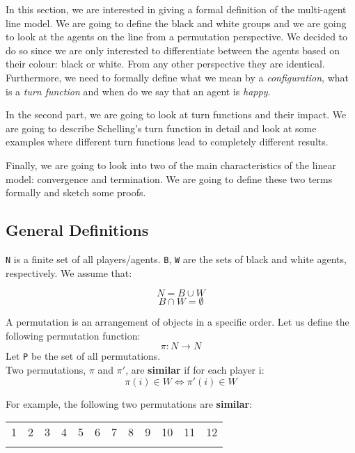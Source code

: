 \documentclass[../main.tex]{subfiles}
\begin{document}
In this section, we are interested in giving a formal definition of the multi-agent line model. We are going to define the black and white groups and we are going to look at the agents on the line from a permutation perspective. We decided to do so since we are only interested to differentiate between the agents based on their colour: black or white. From any other perspective they are identical. Furthermore, we need to formally define what we mean by a \textit{configuration}, what is a \textit{turn function} and when do we say that an agent is \textit{happy}. 

In the second part, we are going to look at turn functions and their impact. We are going to describe Schelling's turn function in detail and look at some examples where different turn functions lead to completely different results.

Finally, we are going to look into two of the main characteristics of the linear model: convergence and termination. We are going to define these two terms formally and sketch some proofs.

\subsection{General Definitions}
\verb|N| is a finite set of all players/agents. \verb|B|, \verb|W| are the sets of black and white agents, respectively. We assume that:

\[ N = B \cup W\]
\[B \cap W = \emptyset\]

A permutation is an arrangement of objects in a specific order. Let us define the following permutation function:
\[ \pi : N \rightarrow N\]
Let \verb|P| be the set of all permutations.\\

Two permutations, $\pi$ and $\pi'$, are \textbf{similar} if for each player i:
\[\pi(i) \in W \Leftrightarrow \pi'(i) \in W\]

For example, the following two permutations are \textbf{similar}:
\begin{table}[H]
\begin{center}
{\begin{tabular}{| c |c| c| c| c |c| c |c| c |c |c |c |}
\hline
1 & 2 &3 &4 &5 &6  &7 &8 &9 &10 &11 & 12 \\
\x & \x &\z &\z &\z &\z  &\z &\z &\x &\x &\x & \x \\
 \hline
\end{tabular}}
\end{center}
\end{table}
\end{document}
